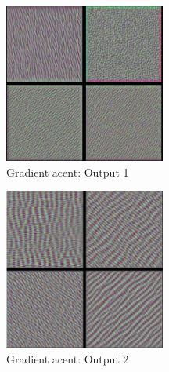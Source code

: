 \documentclass{article} %
\begin{document}
\begin{figure}[h]
  \begin{center}
  \includegraphics[width=200]{m1_1.png}
  \end{center}
  \caption{Gradient acent: Output 1}
\end{figure}

\begin{figure}[h]
  \begin{center}
  \includegraphics[width=200]{m1_2.png}
  \end{center}
  \caption{Gradient acent: Output 2}
\end{figure}
\end{document}
